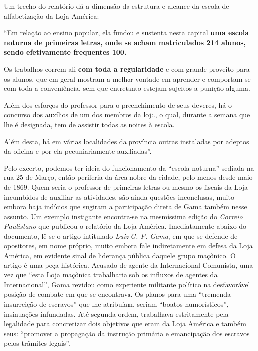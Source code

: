 Um trecho do relatório dá a dimensão da estrutura e alcance da escola de
alfabetização da Loja América:

``Em relação ao ensino popular, ela fundou e sustenta nesta capital
\textbf{uma escola noturna de primeiras letras, onde se acham
matriculados 214 alunos, sendo efetivamente frequentes 100.}

Os trabalhos correm ali \textbf{com toda a regularidade} e com grande
proveito para os alunos, que em geral mostram a melhor vontade em
aprender e comportam-se com toda a conveniência, sem que entretanto
estejam sujeitos a punição alguma.

Além dos esforços do professor para o preenchimento de seus deveres, há
o concurso dos auxílios de um dos membros da loj:., o qual, durante a
semana que lhe é designada, tem de assistir todas as noites à escola.

Além desta, há em várias localidades da província outras instaladas por
adeptos da oficina e por ela pecuniariamente auxiliadas''.

Pelo excerto, podemos ter ideia do funcionamento da ``escola noturna''
sediada na rua 25 de Março, então periferia da área nobre da cidade,
pelo menos desde maio de 1869. Quem seria o professor de primeiras
letras ou mesmo os fiscais da Loja incumbidos de auxiliar as atividades,
são ainda questões inconclusas, muito embora haja indícios que sugiram a
participação direta de Gama também nesse assunto. Um exemplo instigante
encontra-se na mesmíssima edição do \emph{Correio Paulistano} que
publicou o relatório da Loja América. Imediatamente abaixo do documento,
lê-se o artigo intitulado \emph{Luiz G. P. Gama}, em que se defende de
opositores, em nome próprio, muito embora fale indiretamente em defesa
da Loja América, em evidente sinal de liderança pública daquele grupo
maçônico. O artigo é uma peça histórica. Acusado de agente da
Internacional Comunista, uma vez que ``esta Loja maçônica
trabalharia sob os influxos de agentes da Internacional'', Gama
revidou como experiente militante político na desfavorável posição de
combate em que se encontrava. Os planos para uma ``tremenda insurreição
de escravos'' que lhe atribuíam, seriam ``boatos humorísticos'',
insinuações infundadas. Até segunda ordem, trabalhava estritamente pela
legalidade para concretizar dois objetivos que eram da Loja América e
também seus: ``promover a propagação da instrução primária e emancipação
dos escravos pelos trâmites legais''.


